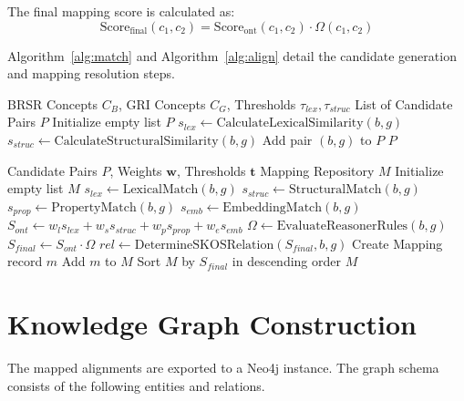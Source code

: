 \documentclass[journal,compsoc]{IEEEtran}
\begin{document}
\begin{itemize}
\begin{table}[t]
\begin{itemize}
The final mapping score is calculated as:
\begin{equation}
\text{Score}_{\text{final}}(c_1, c_2) = \text{Score}_{\text{ont}}(c_1, c_2) \cdot \Omega(c_1, c_2)
\label{eq:final}
\end{equation}

Algorithm~\ref{alg:match} and Algorithm~\ref{alg:align} detail the candidate generation and mapping resolution steps.

\begin{algorithm}
\caption{Ontology-Guided Candidate Generation}
\label{alg:match}
\begin{algorithmic}[1]
\REQUIRE BRSR Concepts $C_B$, GRI Concepts $C_G$, Thresholds $\tau_{lex}, \tau_{struc}$
\ENSURE List of Candidate Pairs $P$
\STATE Initialize empty list $P$
        \STATE $s_{lex} \leftarrow \text{CalculateLexicalSimilarity}(b, g)$
        \STATE $s_{struc} \leftarrow \text{CalculateStructuralSimilarity}(b, g)$
            \STATE Add pair $(b, g)$ to $P$
        \ENDIF
    \ENDFOR
\ENDFOR
\RETURN $P$
\end{algorithmic}
\end{algorithm}

\begin{algorithm}
\caption{Ontology Mapping Engine}
\label{alg:align}
\begin{algorithmic}[1]
\REQUIRE Candidate Pairs $P$, Weights $\mathbf{w}$, Thresholds $\mathbf{t}$
\ENSURE Mapping Repository $M$
\STATE Initialize empty list $M$
    \STATE $s_{lex} \leftarrow \text{LexicalMatch}(b, g)$
    \STATE $s_{struc} \leftarrow \text{StructuralMatch}(b, g)$
    \STATE $s_{prop} \leftarrow \text{PropertyMatch}(b, g)$
    \STATE $s_{emb} \leftarrow \text{EmbeddingMatch}(b, g)$
    \STATE $S_{ont} \leftarrow w_l s_{lex} + w_s s_{struc} + w_p s_{prop} + w_e s_{emb}$
    \STATE $\Omega \leftarrow \text{EvaluateReasonerRules}(b, g)$
    \STATE $S_{final} \leftarrow S_{ont} \cdot \Omega$
        \STATE $rel \leftarrow \text{DetermineSKOSRelation}(S_{final}, b, g)$
        \STATE Create Mapping record $m$
        \STATE Add $m$ to $M$
    \ENDIF
\ENDFOR
\STATE Sort $M$ by $S_{final}$ in descending order
\RETURN $M$
\end{algorithmic}
\end{algorithm}

\section{Knowledge Graph Construction}
The mapped alignments are exported to a Neo4j instance. The graph schema consists of the following entities and relations.


\end{itemize}
\end{table}
\end{itemize}
\end{document}
